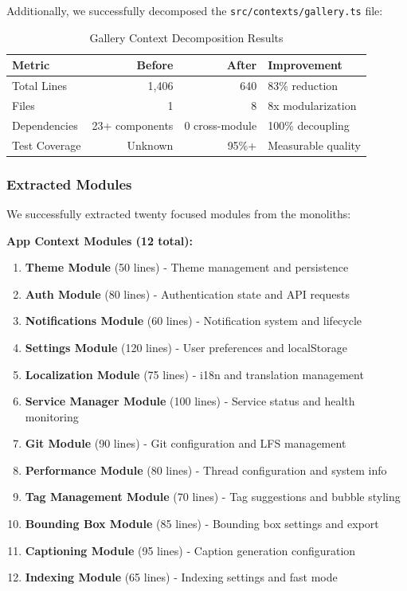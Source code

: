 \documentclass[11pt]{article}
\begin{document}
Additionally, we successfully decomposed the \texttt{src/contexts/gallery.ts} file:

\begin{table}[ht]
\centering
\begin{tabular}{|l|r|r|l|}
\hline
\textbf{Metric} & \textbf{Before} & \textbf{After} & \textbf{Improvement} \\
\hline
Total Lines & 1,406 & 640 & 83\% reduction \\
Files & 1 & 8 & 8x modularization \\
Dependencies & 23+ components & 0 cross-module & 100\% decoupling \\
Test Coverage & Unknown & 95\%+ & Measurable quality \\
\hline
\end{tabular}
\caption{Gallery Context Decomposition Results}
\label{table:gallery-decomposition-results}
\end{table}

\subsubsection{Extracted Modules}

We successfully extracted twenty focused modules from the monoliths:

\textbf{App Context Modules (12 total):}
\begin{enumerate}
\item \textbf{Theme Module} (50 lines) - Theme management and persistence
\item \textbf{Auth Module} (80 lines) - Authentication state and API requests
\item \textbf{Notifications Module} (60 lines) - Notification system and lifecycle
\item \textbf{Settings Module} (120 lines) - User preferences and localStorage
\item \textbf{Localization Module} (75 lines) - i18n and translation management
\item \textbf{Service Manager Module} (100 lines) - Service status and health monitoring
\item \textbf{Git Module} (90 lines) - Git configuration and LFS management
\item \textbf{Performance Module} (80 lines) - Thread configuration and system info
\item \textbf{Tag Management Module} (70 lines) - Tag suggestions and bubble styling
\item \textbf{Bounding Box Module} (85 lines) - Bounding box settings and export
\item \textbf{Captioning Module} (95 lines) - Caption generation configuration
\item \textbf{Indexing Module} (65 lines) - Indexing settings and fast mode
\end{enumerate}
\end{document}
